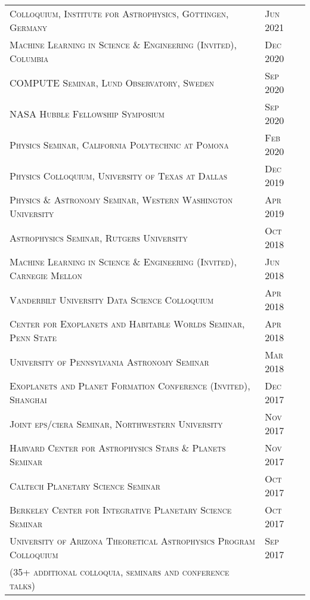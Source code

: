 \documentclass[10pt]{article} %
\begin{document}
\begin{tabular}{l>{\hfill}p{2.8cm}}
\textsc{Colloquium, Institute for Astrophysics, G{\"o}ttingen, Germany} & \textsc{Jun} 2021 \\
\textsc{Machine Learning in Science \& Engineering (Invited), Columbia} & \textsc{Dec} 2020 \\
\textsc{COMPUTE Seminar, Lund Observatory, Sweden} & \textsc{Sep} 2020 \\
\textsc{NASA Hubble Fellowship Symposium} & \textsc{Sep} 2020 \\
\textsc{Physics Seminar, California Polytechnic at Pomona} & \textsc{Feb} 2020 \\
\textsc{Physics Colloquium, University of Texas at Dallas} & \textsc{Dec} 2019  \\
\textsc{Physics \& Astronomy Seminar, Western Washington University} & \textsc{Apr} 2019 \\
\textsc{Astrophysics Seminar, Rutgers University} & \textsc{Oct} 2018 \\
\textsc{Machine Learning in Science \& Engineering (Invited), Carnegie Mellon} & \textsc{Jun} 2018 \\
\textsc{Vanderbilt University Data Science Colloquium} & \textsc{Apr} 2018 \\
\textsc{Center for Exoplanets and Habitable Worlds Seminar, Penn State} & \textsc{Apr} 2018 \\
\textsc{University of Pennsylvania Astronomy Seminar} & \textsc{Mar} 2018 \\
\textsc{Exoplanets and Planet Formation Conference (Invited), Shanghai} & \textsc{Dec} 2017 \\
\textsc{Joint eps/ciera Seminar, Northwestern University} & \textsc{Nov} 2017 \\
\textsc{Harvard Center for Astrophysics Stars \& Planets Seminar} & \textsc{Nov} 2017 \\
\textsc{Caltech Planetary Science Seminar} & \textsc{Oct} 2017 \\
\textsc{Berkeley Center for Integrative Planetary Science Seminar} & \textsc{Oct} 2017 \\
\textsc{University of Arizona Theoretical Astrophysics Program Colloquium} & \textsc{Sep} 2017 \\
\textsc{(35+ additional colloquia, seminars and conference talks)}
\end{tabular}
\end{document}
